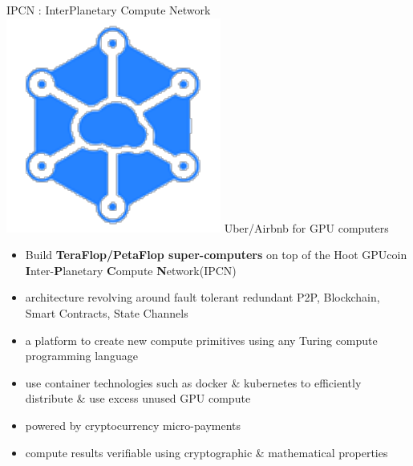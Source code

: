 \begin{frame}[t]{IPCN
	: InterPlanetary Compute Network}
	\includegraphics[scale=.3]{static/ipcn-p2p}
	 Uber/Airbnb for GPU computers
 \begin{itemize}[<+-| alert@+>]
 \item Build \textbf{TeraFlop/PetaFlop super-computers} on top of the  Hoot GPUcoin \textbf{I}nter-\textbf{P}lanetary \textbf{C}ompute \textbf{N}etwork(IPCN)
 \item architecture revolving around fault tolerant redundant P2P, Blockchain, Smart Contracts, State Channels
 \item a platform to create new compute primitives using any Turing compute programming language
 \item use container technologies such as docker \& kubernetes to efficiently distribute \& use excess unused GPU compute
 \item powered by cryptocurrency micro-payments
 \item compute results verifiable using cryptographic \& mathematical properties
 \end{itemize}
\end{frame}